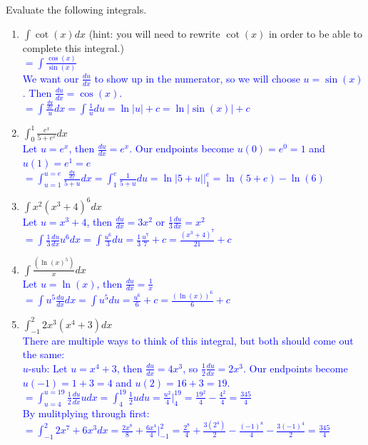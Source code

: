 \documentclass{ximera}
\begin{document}
\begin{exercise}
    Evaluate the following integrals.
    \begin{enumerate}
        \item $\int \cot(x)dx $ (hint: you will need to rewrite $\cot(x)$ in order to be able to complete this integral.)\\
        \textcolor{blue}{$=\int \frac{\cos(x)}{\sin(x)}$\\
        We want our $\frac{du}{dx}$ to show up in the numerator, so we will choose $u=\sin(x)$.  Then $\frac{du}{dx}=\cos(x)$.\\
        $=\int \frac{\frac{du}{dx}}{u}dx=\int \frac{1}{u}du=\ln|u|+c=\ln|\sin(x)|+c$}
        
        \item $\int_0^1 \frac{e^x}{5+e^x}dx$\\
        \textcolor{blue}{Let $u=e^x$, then $\frac{du}{dx}=e^x$.  Our endpoints become $u(0)=e^0=1$ and $u(1)=e^1=e$\\
        $=\int_{u=1}^{u=e} \frac{\frac{du}{dx}}{5+u}dx=\int_1^e \frac{1}{5+u}du=\ln|5+u|\bigg|_1^e=\ln(5+e)-\ln(6)$}
        
        \item $\int x^2(x^3+4)^6dx$\\
        \textcolor{blue}{Let $u=x^3+4$, then $\frac{du}{dx}=3x^2$ or $\frac{1}{3}\frac{du}{dx}=x^2$\\
        $=\int \frac{1}{3}\frac{du}{dx}u^6dx=\int \frac{u^6}{3}du=\frac{1}{3}\frac{u^7}{7}+c=\frac{(x^3+4)^7}{21}+c$}
        
        \item $\int \frac{(\ln(x)^5)}{x}dx$\\
        \textcolor{blue}{Let $u=\ln(x)$, then $\frac{du}{dx}=\frac{1}{x}$\\
        $=\int u^5\frac{du}{dx}dx=\int u^5 du=\frac{u^6}{6}+c=\frac{(\ln(x))^6}{6}+c$}
        
        \item $\int_{-1}^2 2x^3(x^4+3)dx$\\
        \textcolor{blue}{There are multiple ways to think of this integral, but both should come out the same:\\
        $u$-sub: Let $u=x^4+3$, then $\frac{du}{dx}=4x^3$, so $\frac{1}{2}\frac{du}{dx}=2x^3$.  Our endpoints become $u(-1)=1+3=4$ and $u(2)=16+3=19$.\\
        $=\int_{u=4}^{u=19}\frac{1}{2}\frac{du}{dx} u dx=\int_4^{19} \frac12 udu=\frac{u^2}{4}\bigg|_4^{19}=\frac{19^2}{4}-\frac{4^2}{4}=\frac{345}{4}$\\
        By mulitplying through first:\\
        $=\int_{-1}^{2} 2x^7+6x^3 dx=\frac{2x^8}{8}+\frac{6x^4}{4}\bigg|_{-1}^2=\frac{2^8}{4}+\frac{3(2^4)}{2}-\frac{(-1)^8}{4}-\frac{3(-1)^4}{2}=\frac{345}{4}$}
    \end{enumerate}
\end{exercise}
\end{document}

